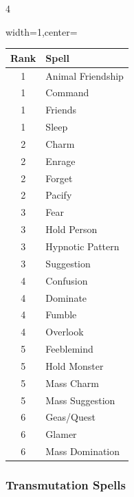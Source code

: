 \documentclass{book}
\begin{document}
\begin{multicols}{4}
\begin{table}[H]
	\begin{adjustbox}{width=1\columnwidth,center=\columnwidth}
		\begin{tabular}{cl}
			\toprule
			Rank & Spell \\
			\midrule
				1 & Animal Friendship \\
				1 & Command \\
				1 & Friends \\
				1 & Sleep \\
				2 & Charm \\
				2 & Enrage \\
				2 & Forget \\
				2 & Pacify \\
				3 & Fear \\
				3 & Hold Person \\
				3 & Hypnotic Pattern \\
				3 & Suggestion \\
				4 & Confusion \\
				4 & Dominate \\
				4 & Fumble \\
				4 & Overlook \\
				5 & Feeblemind \\
				5 & Hold Monster \\
				5 & Mass Charm \\
				5 & Mass Suggestion \\
				6 & Geas/Quest \\
				6 & Glamer \\
				6 & Mass Domination \\
			\bottomrule
\end{tabular}
\end{adjustbox}
\end{table}
		
\vfill

\subsubsection*{Transmutation Spells}\label{transmutation-spells}


\end{multicols}
\end{document}
